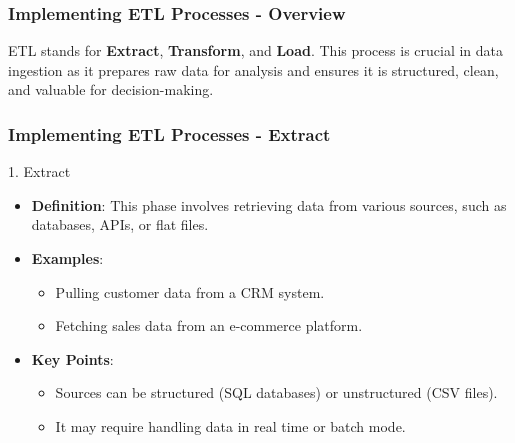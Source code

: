 \documentclass{beamer}
\begin{document}
\begin{frame}[fragile]
    \frametitle{Implementing ETL Processes - Overview}
    ETL stands for \textbf{Extract}, \textbf{Transform}, and \textbf{Load}. This process is crucial in data ingestion as it prepares raw data for analysis and ensures it is structured, clean, and valuable for decision-making.
\end{frame}

\begin{frame}[fragile]
    \frametitle{Implementing ETL Processes - Extract}
    \begin{block}{1. Extract}
        \begin{itemize}
            \item \textbf{Definition}: This phase involves retrieving data from various sources, such as databases, APIs, or flat files.
            \item \textbf{Examples}:
                \begin{itemize}
                    \item Pulling customer data from a CRM system.
                    \item Fetching sales data from an e-commerce platform.
                \end{itemize}
            \item \textbf{Key Points}:
                \begin{itemize}
                    \item Sources can be structured (SQL databases) or unstructured (CSV files).
                    \item It may require handling data in real time or batch mode.
                \end{itemize}
        \end{itemize}
    \end{block}
\end{frame}
\end{document}
